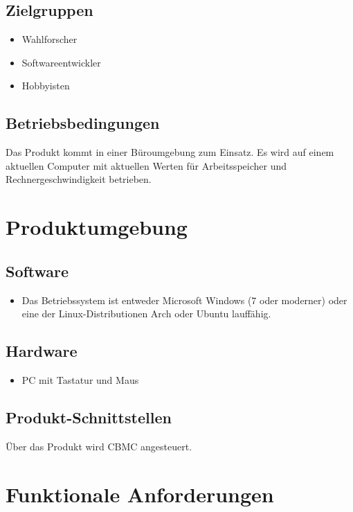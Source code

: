 \documentclass[a4paper]{scrreprt}
\begin{document}
\section{Zielgruppen}
\begin{itemize}
\item Wahlforscher
\item Softwareentwickler
\item Hobbyisten
\end{itemize}

\section{Betriebsbedingungen}
Das Produkt kommt in einer Büroumgebung zum Einsatz. Es wird auf einem aktuellen Computer mit aktuellen Werten für Arbeitsspeicher und Rechnergeschwindigkeit betrieben.


\chapter{Produktumgebung}

\section{Software}
\begin{itemize}
\item Das Betriebssystem ist entweder Microsoft Windows (7 oder moderner) oder eine der Linux-Distributionen Arch oder Ubuntu lauffähig.
\end{itemize}

\section{Hardware}
\begin{itemize}
\item PC mit Tastatur und Maus
\end{itemize}

\section{Produkt-Schnittstellen}
Über das Produkt wird \ac{CBMC} angesteuert.

\chapter{Funktionale Anforderungen}
\end{document}
